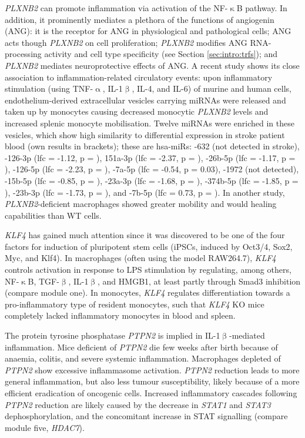 \emph{PLXNB2} can promote inflammation via activation of the NF-$\upkappa$B pathway.\cite{Zhang2018} In addition, it prominently mediates a plethora of the functions of angiogenin (ANG): it is the receptor for ANG in physiological and pathological cells; ANG acts though \emph{PLXNB2} on cell proliferation; \emph{PLXNB2} modifies ANG RNA-processing activity and cell type specificity (see Section \ref{sec:intro:trfs}); and \emph{PLXNB2} mediates neuroprotective effects of ANG.\cite{Yu2017} A recent study shows its close association to inflammation-related circulatory events: upon inflammatory stimulation (using TNF-$\upalpha$, IL-1$\upbeta$, IL-4, and IL-6) of murine and human cells, endothelium-derived extracellular vesicles carrying miRNAs were released and taken up by monocytes causing decreased monocytic \emph{PLXNB2} levels and increased splenic monocyte mobilisation.\cite{Akbar2017} Twelve miRNAs were enriched in these vesicles, which show high similarity to differential expression in stroke patient blood (own results in brackets); these are hsa-miRs: -632 (not detected in stroke), -126-3p (\ac{lfc} = -1.12, p = ), 151a-3p (\ac{lfc} = -2.37, p = ), -26b-5p (\ac{lfc} = -1.17, p = ), -126-5p (\ac{lfc} = -2.23, p = ), -7a-5p (\ac{lfc} = -0.54, p = 0.03), -1972 (not detected), -15b-5p (\ac{lfc} = -0.85, p = ), -23a-3p (\ac{lfc} = -1.68, p = ), -374b-5p (\ac{lfc} = -1.85, p = ), -23b-3p (\ac{lfc} = -1.73, p = ), and -7b-5p (\ac{lfc} = 0.73, p = ). In another study, \emph{PLXNB2}-deficient macrophages showed greater mobility and would healing capabilities than WT cells.\cite{Roney2011}

\emph{KLF4} has gained much attention since it was discovered to be one of the four factors for induction of pluripotent stem cells (iPSCs, induced by Oct3/4, Sox2, Myc, and Klf4).\cite{Takahashi2006} In macrophages (often using the model RAW264.7), \emph{KLF4} controls activation in response to LPS stimulation by regulating, among others, NF-$\upkappa$B, TGF-$\upbeta$, IL-1$\upbeta$, and HMGB1, at least partly through Smad3 inhibition (compare module one).\cite{Feinberg2005,Liu2008,Liu2012} In monocytes, \emph{KLF4} regulates differentiation towards a pro-inflammatory type of resident monocytes, such that \emph{KLF4} KO mice completely lacked inflammatory monocytes in blood and spleen.\cite{Feinberg2007,Alder2008,Kurotaki2013}

The protein tyrosine phosphatase \emph{PTPN2} is implied in IL-1$\upbeta$-mediated inflammation. Mice deficient of \emph{PTPN2} die few weeks after birth because of anaemia, colitis, and severe systemic inflammation. Macrophages depleted of \emph{PTPN2} show excessive inflammasome activation. \emph{PTPN2} reduction leads to more general inflammation, but also less tumour susceptibility, likely because of a more efficient eradication of oncogenic cells.\cite{Spalinger2018} Increased inflammatory cascades following \emph{PTPN2} reduction are likely caused by the decrease in \emph{STAT1} and \emph{STAT3} dephosphorylation, and the concomitant increase in STAT signalling (compare module five, \emph{HDAC7}).\cite{Kim2018a}
 

